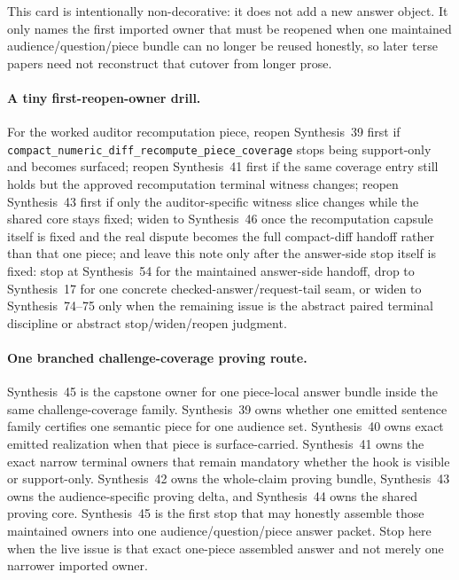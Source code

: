 \documentclass[11pt]{article}
\begin{document}
This card is intentionally non-decorative: it does not add a new answer object. It only names the first imported owner that must be reopened when one maintained audience/question/piece bundle can no longer be reused honestly, so later terse papers need not reconstruct that cutover from longer prose.\cite{series:challengeroutes,series:challengestops,series:challengebranches,series:challengecoverage,series:challengesurfacehooks,series:challengeterminalwitnesses,series:challengecoveragewitnesspacks,series:challengecoveragewitnessslices,series:challengecoveragewitnesscores,series:challengeanswersheets,series:challengeanswerreviewmenus,series:pairedterminalcitationdiscipline,series:pairedterminalcutoverrules}

\paragraph{A tiny first-reopen-owner drill.}
For the worked auditor recomputation piece, reopen Synthesis~39 first if \nolinkurl{compact_numeric_diff_recompute_piece_coverage} stops being support-only and becomes surfaced; reopen Synthesis~41 first if the same coverage entry still holds but the approved recomputation terminal witness changes; reopen Synthesis~43 first if only the auditor-specific witness slice changes while the shared core stays fixed; widen to Synthesis~46 once the recomputation capsule itself is fixed and the real dispute becomes the full compact-diff handoff rather than that one piece; and leave this note only after the answer-side stop itself is fixed: stop at Synthesis~54 for the maintained answer-side handoff, drop to Synthesis~17 for one concrete checked-answer/request-tail seam, or widen to Synthesis~74--75 only when the remaining issue is the abstract paired terminal discipline or abstract stop/widen/reopen judgment.\cite{series:workedexample}

\paragraph{One branched challenge-coverage proving route.}
Synthesis~45 is the capstone owner for one piece-local answer bundle inside the same challenge-coverage family. Synthesis~39 owns whether one emitted sentence family certifies one semantic piece for one audience set. Synthesis~40 owns exact emitted realization when that piece is surface-carried. Synthesis~41 owns the exact narrow terminal owners that remain mandatory whether the hook is visible or support-only. Synthesis~42 owns the whole-claim proving bundle, Synthesis~43 owns the audience-specific proving delta, and Synthesis~44 owns the shared proving core. Synthesis~45 is the first stop that may honestly assemble those maintained owners into one audience/question/piece answer packet. Stop here when the live issue is that exact one-piece assembled answer and not merely one narrower imported owner.
\end{document}
